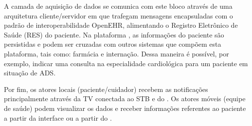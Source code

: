 A camada de aquisição de dados se comunica com este bloco através de uma
arquitetura cliente/servidor em que trafegam mensagens encapsuladas com o
padrão de interoperabilidade OpenEHR, alimentando o Registro Eletrônico de
Saúde (RES) do paciente. Na plataforma \nextsaude, as informações do paciente
são persistidas e podem ser cruzadas com outros sistemas que compõem esta
plataforma, tais como: farmácia e internação.  Dessa maneira é possível, por
exemplo, indicar uma consulta na especialidade cardiológica para um paciente em
situação de ADS.

Por fim, os atores locais (paciente/cuidador) recebem as notificações
principalmente através da TV conectada ao STB e do \smartphone. Os atores
móveis (equipe de saúde) podem visualizar os dados e receber informações
referentes ao paciente a partir da interface \web[] ou a partir do \smartphone.


